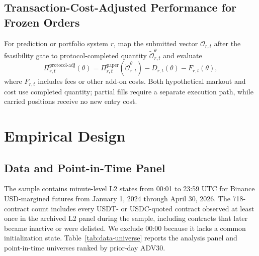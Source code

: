 \documentclass[sigconf]{acmart}
\begin{document}
\subsection{Transaction-Cost-Adjusted Performance for Frozen Orders}
For prediction or portfolio system $r$, map the submitted vector $\mathcal O_{r,t}$ after the feasibility gate to protocol-completed quantity $\widetilde{\mathcal O}_{r,t}^{\theta}$ and evaluate
\begin{equation}
\Pi^{\mathrm{protocol\text{-}adj}}_{r,t}(\theta)
=\Pi^{\mathrm{paper}}_{r,t}\!\left(\widetilde{\mathcal O}_{r,t}^{\theta}\right)
-D_{r,t}(\theta)-F_{r,t}(\theta),
\end{equation}
where $F_{r,t}$ includes fees or other add-on costs. Both hypothetical markout and cost use completed quantity; partial fills require a separate execution path, while carried positions receive no new entry cost.

\section{Empirical Design}
\subsection{Data and Point-in-Time Panel}
The sample contains minute-level L2 states from 00:01 to 23:59 UTC for Binance USD-margined futures from January 1, 2024 through April 30, 2026. The 718-contract count includes every USDT- or USDC-quoted contract observed at least once in the archived L2 panel during the sample, including contracts that later became inactive or were delisted. We exclude 00:00 because it lacks a common initialization state. Table~\ref{tab:data-universe} reports the analysis panel and point-in-time universes ranked by prior-day ADV30.
\end{document}
